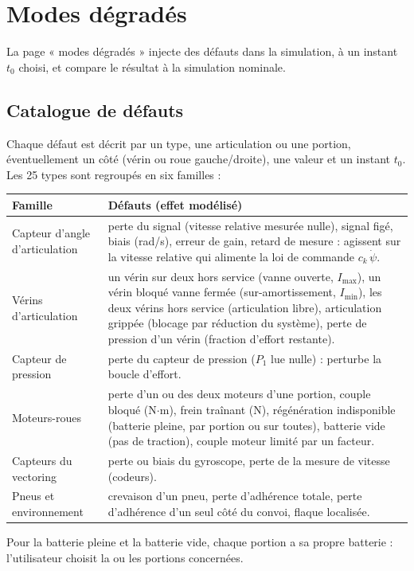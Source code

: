 \documentclass[11pt,a4paper]{article}
\newcommand{\dt}[1]{\dot{#1}}
\begin{document}
\section{Modes dégradés}\label{sec:def}
La page « modes dégradés » injecte des défauts dans la simulation, à un instant $t_0$ choisi, et compare le résultat à la simulation nominale.

\subsection{Catalogue de défauts}
Chaque défaut est décrit par un type, une articulation ou une portion, éventuellement un côté (vérin ou roue gauche/droite), une valeur et un instant $t_0$. Les 25 types sont regroupés en six familles :
\begin{center}\small
\begin{tabularx}{\linewidth}{@{}p{3.1cm}X@{}}\toprule
Famille & Défauts (effet modélisé)\\\midrule
Capteur d'angle d'articulation & perte du signal (vitesse relative mesurée nulle), signal figé, biais (rad/s), erreur de gain, retard de mesure : agissent sur la vitesse relative qui alimente la loi de commande $c_k\,\dt\psi$.\\
Vérins d'articulation & un vérin sur deux hors service (vanne ouverte, $I_{\max}$), un vérin bloqué vanne fermée (sur-amortissement, $I_{\min}$), les deux vérins hors service (articulation libre), articulation grippée (blocage par réduction du système), perte de pression d'un vérin (fraction d'effort restante).\\
Capteur de pression & perte du capteur de pression ($P_1$ lue nulle) : perturbe la boucle d'effort.\\
Moteurs-roues & perte d'un ou des deux moteurs d'une portion, couple bloqué (N$\cdot$m), frein traînant (N), régénération indisponible (batterie pleine, par portion ou sur toutes), batterie vide (pas de traction), couple moteur limité par un facteur.\\
Capteurs du vectoring & perte ou biais du gyroscope, perte de la mesure de vitesse (codeurs).\\
Pneus et environnement & crevaison d'un pneu, perte d'adhérence totale, perte d'adhérence d'un seul côté du convoi, flaque localisée.\\\bottomrule
\end{tabularx}
\end{center}
Pour la batterie pleine et la batterie vide, chaque portion a sa propre batterie : l'utilisateur choisit la ou les portions concernées.
\end{document}
